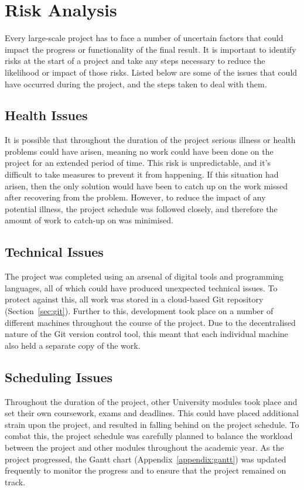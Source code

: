 \documentclass[11pt,a4paper]{report}
\begin{document}
\section{Risk Analysis}
Every large-scale project has to face a number of uncertain factors that could impact the progress or functionality of the final result. It is important to identify risks at the start of a project and take any steps necessary to reduce the likelihood or impact of those risks. Listed below are some of the issues that could have occurred during the project, and the steps taken to deal with them.

\subsection{Health Issues}
It is possible that throughout the duration of the project serious illness or health problems could have arisen, meaning no work could have been done on the project for an extended period of time. This risk is unpredictable, and it's difficult to take measures to prevent it from happening. If this situation had arisen, then the only solution would have been to catch up on the work missed after recovering from the problem. However, to reduce the impact of any potential illness, the project schedule was followed closely, and therefore the amount of work to catch-up on was minimised.

\subsection{Technical Issues}
The project was completed using an arsenal of digital tools and programming languages, all of which could have produced unexpected technical issues. To protect against this, all work was stored in a cloud-based Git repository (Section~\ref{sec:git}). Further to this, development took place on a number of different machines throughout the course of the project. Due to the decentralised nature of the Git version control tool, this meant that each individual machine also held a separate copy of the work.

\subsection{Scheduling Issues}
Throughout the duration of the project, other University modules took place and set their own coursework, exams and deadlines. This could have placed additional strain upon the project, and resulted in falling behind on the project schedule. To combat this, the project schedule was carefully planned to balance the workload between the project and other modules throughout the academic year. As the project progressed, the Gantt chart (Appendix~\ref{appendix:gantt}) was updated frequently to monitor the progress and to ensure that the project remained on track.
\end{document}
